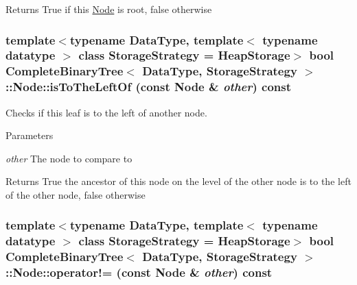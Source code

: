 \begin{DoxyReturn}{Returns}
True if this \hyperlink{class_complete_binary_tree_1_1_node}{Node} is root, false otherwise 
\end{DoxyReturn}
\hypertarget{class_complete_binary_tree_1_1_node_abd6c532c0fead0a2a1b014973d6208d1}{
\subsubsection[{isToTheLeftOf}]{\setlength{\rightskip}{0pt plus 5cm}template$<$typename DataType, template$<$ typename datatype $>$ class StorageStrategy = HeapStorage$>$ bool {\bf CompleteBinaryTree}$<$ DataType, StorageStrategy $>$::Node::isToTheLeftOf (const {\bf Node} \& {\em other}) const}}
\label{class_complete_binary_tree_1_1_node_abd6c532c0fead0a2a1b014973d6208d1}


Checks if this leaf is to the left of another node. 


\begin{DoxyParams}{Parameters}
\item[{\em other}]The node to compare to \end{DoxyParams}
\begin{DoxyReturn}{Returns}
True the ancestor of this node on the level of the other node is to the left of the other node, false otherwise 
\end{DoxyReturn}
\hypertarget{class_complete_binary_tree_1_1_node_a156e43bb1fecab5634e53d7a026f4914}{
\subsubsection[{operator!=}]{\setlength{\rightskip}{0pt plus 5cm}template$<$typename DataType, template$<$ typename datatype $>$ class StorageStrategy = HeapStorage$>$ bool {\bf CompleteBinaryTree}$<$ DataType, StorageStrategy $>$::Node::operator!= (const {\bf Node} \& {\em other}) const}}
\label{class_complete_binary_tree_1_1_node_a156e43bb1fecab5634e53d7a026f4914}


